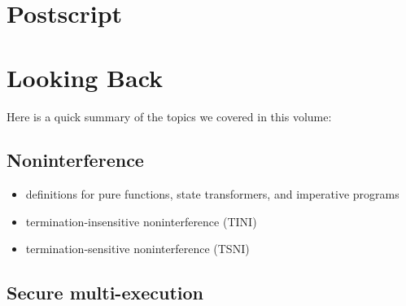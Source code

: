 \documentclass[12pt]{report}
\begin{document}

\begin{coqdoccode}
\end{coqdoccode}
\section{Postscript}


\begin{coqdoccode}
\coqdocemptyline
\end{coqdoccode}
\section{Looking Back}



 Here is a quick summary of the topics we covered in this volume: 

\subsection{Noninterference}



\begin{itemize}
\item  definitions for pure functions, state transformers,
  and imperative programs

\item  termination-insensitive noninterference (TINI)

\item  termination-sensitive noninterference (TSNI) 
\end{itemize}


\subsection{Secure multi-execution}
\end{document}
